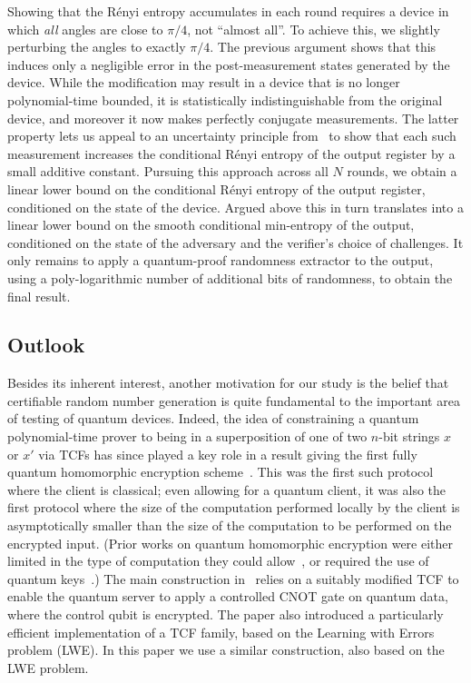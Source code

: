 \documentclass[11pt]{article}
\theoremstyle{remark}
\theoremstyle{definition}
\begin{document}
Showing that the R\'enyi entropy accumulates in each round requires a device in which \emph{all} angles are close to $\pi/4$, not ``almost all''. To achieve this, we slightly perturbing the angles to 
exactly $\pi/4$. The previous argument shows that this induces only a negligible error in the post-measurement states generated by the device. While the modification may result in a device that is no longer polynomial-time bounded, it is statistically indistinguishable from the original device, and moreover it now makes perfectly conjugate measurements. The latter property lets us appeal to
an uncertainty principle from~\cite{miller2014universal} to show that each such measurement increases the conditional R\'enyi entropy of the output register by a small additive constant. Pursuing this approach across all $N$ rounds, we obtain a linear lower bound on the conditional R\'enyi entropy of the output register, conditioned on the  state of the device. Argued above this in turn translates into a linear lower bound on the smooth conditional min-entropy of the output, conditioned on the state of the adversary and the verifier's choice of challenges. It only remains to apply a quantum-proof randomness extractor to the output, using a poly-logarithmic number of additional bits of randomness, to obtain the final result. 


\subsection{Outlook}




Besides its inherent interest, another motivation for our study is the belief that  certifiable random number generation  is quite fundamental to the important area 
of testing of quantum devices. Indeed, the idea of constraining a quantum polynomial-time prover to being in a superposition of one of two $n$-bit strings $x$ or $x'$ via TCFs has since played a key role in a result giving the first fully quantum homomorphic encryption scheme~\cite{mahadev2017classical}. This was the first such protocol where the client is classical; even allowing for a quantum client, it was also the first protocol where the size of the computation performed locally by the client is asymptotically smaller than the size of the computation to be performed on the encrypted input. (Prior works on quantum homomorphic encryption were either limited in the type of computation they could allow~\cite{broadbent2015quantum}, or required the use of quantum keys~\cite{dulek2016quantum}.) The main construction in~\cite{mahadev2017classical} relies on a
suitably modified TCF to enable the quantum server to apply a controlled CNOT gate on quantum data, where the control qubit is encrypted. The paper also 
introduced a particularly efficient implementation of a TCF family, based on the Learning with Errors problem (LWE). In this paper we use a similar construction, also based on the LWE problem. 
 
\end{document}

